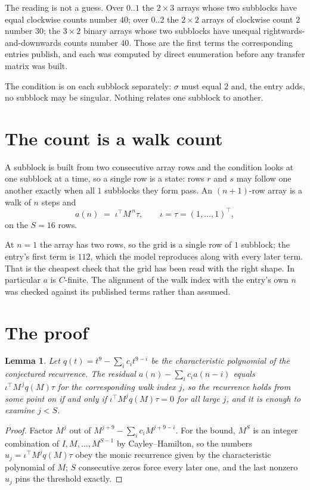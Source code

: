\documentclass[11pt,a4paper]{article}
\theoremstyle{plain}
\newtheorem{lemma}[theorem]{Lemma}
\theoremstyle{definition}
\begin{document}
The reading is not a guess. Over $0..1$ the $2\times3$ arrays whose two subblocks have equal
clockwise counts number $40$; over $0..2$ the $2\times2$ arrays of clockwise count $2$ number
$30$; the $3\times2$ binary arrays whose two subblocks have unequal rightwards-and-downwards
counts number $40$. Those are the first terms the corresponding entries publish, and each was
computed by direct enumeration before any transfer matrix was built.

The condition is on each subblock separately: $\sigma$ must equal $2$ and, the entry adds, no subblock may be singular. Nothing
relates one subblock to another.

\section{The count is a walk count}

A subblock is built from two consecutive array rows and the condition looks
at one subblock at a time, so a single row is a state: rows $r$ and $s$ may follow one another
exactly when all $1$ subblocks they form pass. An $(n+1)$-row array is a walk of $n$ steps and
\[
a(n)\;=\;\iota^{\!\top}M^{\,n}\tau,\qquad\iota=\tau=(1,\dots,1)^{\!\top},
\]
on the $S=16$ rows.

At $n=1$ the array has two rows, so the grid is a single row of $1$
subblock; the entry's first term is $112$, which the model
reproduces along with every later term. That is the cheapest check that the grid has been read
with the right shape.
In particular $a$ is $C$-finite. The alignment of the walk index with the entry's own $n$ was
checked against its published terms rather than assumed.

\section{The proof}

\begin{lemma}\label{lem:crit}
Let $q(t)=t^{9}-\sum_i c_it^{9-i}$ be the characteristic polynomial of the
conjectured recurrence. The residual $a(n)-\sum_ic_ia(n-i)$ equals
$\iota^{\!\top}M^{\,j}q(M)\tau$ for the corresponding walk index $j$, so the recurrence
holds from some point on if and only if $\iota^{\!\top}M^{j}q(M)\tau=0$ for all large $j$,
and it is enough to examine $j<S$.
\end{lemma}

\begin{proof}
Factor $M^{j}$ out of $M^{j+9}-\sum_ic_iM^{j+9-i}$. For the bound, $M^{S}$
is an integer combination of $I,M,\dots,M^{S-1}$ by Cayley--Hamilton, so the numbers
$u_j=\iota^{\!\top}M^{j}q(M)\tau$ obey the monic recurrence given by the characteristic
polynomial of $M$; $S$ consecutive zeros force every later one, and the last nonzero $u_j$
pins the threshold exactly.
\end{proof}
\end{document}
